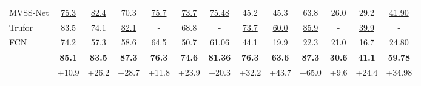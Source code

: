\begin{table*}[ht]
{\begin{tabular}{l|cccccc|cccccc}
MVSS-Net \cite{chen2021image}        & \underline{75.3}            & \underline{82.4}            & 70.3                         & \underline{75.7}            & \underline{73.7}            & \underline{75.48}           & 45.2                         & 45.3                         & 63.8                         & 26.0                        & 29.2                         & \underline{41.90}                          \\
Trufor \cite{guillaro2023trufor}     & 83.5                         & 74.1                         & \underline{82.1}                          & -                            & 68.8                         & -                            & \underline{73.7}                         & \underline{60.0}                        & \underline{85.9}                        & -                           & \underline{39.9}                          & -                             \\
\rowcolor[HTML]{E8E6E6} 
FCN \cite{long2015fully}             & 74.2                         & 57.3                         & 58.6                         & 64.5                         & 50.7                         & 61.06                        & 44.1                         & 19.9                         & 22.3                         & 21.0                        & 16.7                         & 24.80                         \\
\rowcolor[HTML]{E8E6E6} 
\cellcolor[HTML]{E8E6E6}                              & \textbf{85.1}                & \textbf{83.5}                & \textbf{87.3}                & \textbf{76.3}                & \textbf{74.6}                & \textbf{81.36}               & \textbf{76.3}                & \textbf{63.6}                & \textbf{87.3}                & \textbf{30.6}               & \textbf{41.1}                & \textbf{59.78}                \\
\rowcolor[HTML]{E8E6E6} 
\multirow{-2}{*}{\cellcolor[HTML]{E8E6E6}IMDPrompter} & {\color[HTML]{FE0000} +10.9} & {\color[HTML]{FE0000} +26.2} & {\color[HTML]{FE0000} +28.7} & {\color[HTML]{FE0000} +11.8} & {\color[HTML]{FE0000} +23.9} & {\color[HTML]{FE0000} +20.3} & {\color[HTML]{FE0000} +32.2} & {\color[HTML]{FE0000} +43.7} & {\color[HTML]{FE0000} +65.0} & {\color[HTML]{FE0000} +9.6} & {\color[HTML]{FE0000} +24.4} & {\color[HTML]{FE0000} +34.98} \\ \hline
\end{tabular}

}
\label{4-1-1}
\end{table*}
